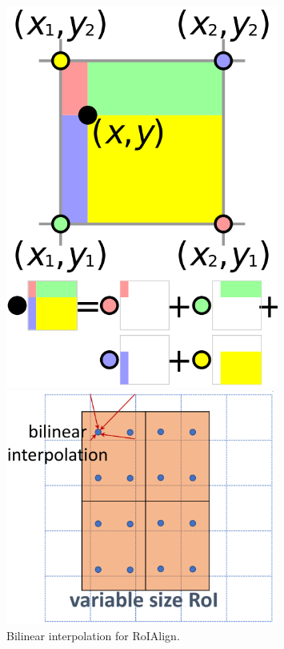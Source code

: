 \begin{figure}[htbp]
	\centering
	\begin{minipage}{0.4\textwidth}
		\centering
		\includegraphics[width=0.8\textwidth]{images/bilinear.png} %
	\end{minipage}\hfill
	\begin{minipage}{0.6\textwidth}
		\centering
		\includegraphics[width=0.8\textwidth]{images/roibilinear.PNG} %
		\caption{Bilinear interpolation for RoIAlign.}
	\end{minipage}
\end{figure}

